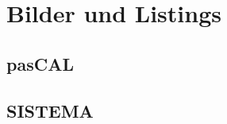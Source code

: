 \chapter{Bilder und Listings}

\section{pasCAL}
\label{sec:pasCAL}

\section{SISTEMA}
\label{sec:SISTEMA}

